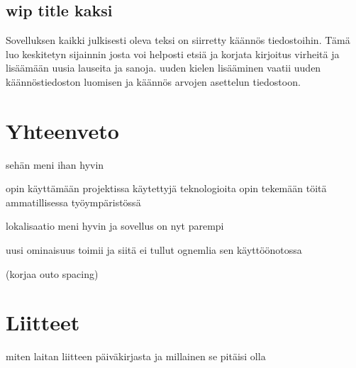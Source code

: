\documentclass[11pt,a4paper,titlepage,oneside]{article}
\begin{document}
\subsection{wip title kaksi}
Sovelluksen kaikki julkisesti oleva teksi on siirretty käännös tiedostoihin. 
Tämä luo keskitetyn sijainnin josta voi helposti etsiä ja korjata kirjoitus virheitä ja lisäämään uusia lauseita ja sanoja.
uuden kielen lisääminen vaatii uuden käännöstiedoston luomisen ja käännös arvojen asettelun tiedostoon.
\medskip











\newpage
{} %










\newpage
\section{Yhteenveto}             %

sehän meni ihan hyvin 

opin käyttämään projektissa käytettyjä teknologioita
opin tekemään töitä ammatillisessa työympäristössä
\medskip


lokalisaatio meni hyvin ja sovellus on nyt parempi
\medskip


uusi ominaisuus toimii ja siitä ei tullut ognemlia sen käyttöönotossa
\medskip





\newpage




(korjaa outo spacing)








\section{Liitteet}               %

miten laitan liitteen päiväkirjasta ja millainen se pitäisi olla
\end{document}
